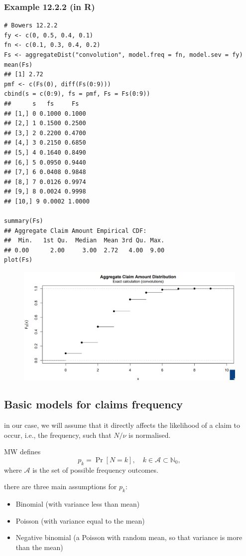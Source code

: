 \documentclass[11pt]{article}
\newcommand{\noi}{\noindent}
\begin{document}
\subsubsection{Example 12.2.2 (in R)}
\begin{lstlisting}
# Bowers 12.2.2
fy <- c(0, 0.5, 0.4, 0.1)
fn <- c(0.1, 0.3, 0.4, 0.2)
Fs <- aggregateDist("convolution", model.freq = fn, model.sev = fy)
mean(Fs)
## [1] 2.72
pmf <- c(Fs(0), diff(Fs(0:9)))
cbind(s = c(0:9), fs = pmf, Fs = Fs(0:9))
##      s   fs     Fs
## [1,] 0 0.1000 0.1000
## [2,] 1 0.1500 0.2500
## [3,] 2 0.2200 0.4700
## [4,] 3 0.2150 0.6850
## [5,] 4 0.1640 0.8490
## [6,] 5 0.0950 0.9440
## [7,] 6 0.0408 0.9848
## [8,] 7 0.0126 0.9974
## [9,] 8 0.0024 0.9998
## [10,] 9 0.0002 1.0000

summary(Fs)
## Aggregate Claim Amount Empirical CDF:
##  Min.   1st Qu.  Median  Mean 3rd Qu. Max.
## 0.00      2.00     3.00  2.72   4.00  9.00
plot(Fs)
\end{lstlisting}
\begin{figure}[H]
    \centering
    \includegraphics[width=0.75\linewidth]{Example 12.2.2 ECDF.png}
\end{figure}

\subsection{Basic models for claims frequency}

\noi in our case, we will assume that it directly affects the likelihood of a claim to occur, i.e., the frequency, such that \(N/\nu\) is normalised.

\noi MW defines
\[
p_k = \Pr[N = k], \quad k \in \mathcal{A} \subset \mathbb{N}_0,
\]
where \(\mathcal{A}\) is the set of possible frequency outcomes.

\noi there are three main assumptions for \(p_k\):
\begin{itemize}
  \item Binomial (with variance less than mean)
  \item Poisson (with variance equal to the mean)
  \item Negative binomial (a Poisson with random mean, so that variance is more than the mean)
\end{itemize}
\end{document}
